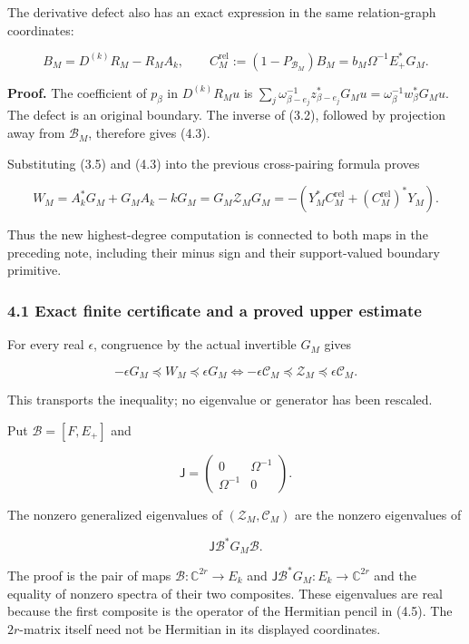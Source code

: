 The derivative defect also has an exact expression in the same
relation-graph coordinates:

\[B_M=D^{(k)}R_M-R_MA_k,\qquad
\boxed{C_M^{\mathrm{rel}}:=(1-P_{\mathcal B_M})B_M=b_M\Omega^{-1}E_+^*G_M.}\tag{4.3}\]

\textbf{Proof.} The coefficient of \(p_\beta\) in \(D^{(k)}R_Mu\) is
\(\sum_j\omega_{\beta-e_j}^{-1}z_{\beta-e_j}^*G_Mu=\omega_\beta^{-1}w_\beta^*G_Mu\).
The defect is an original boundary. The inverse of (3.2), followed by
projection away from \(\mathcal B_M\), therefore gives (4.3).

Substituting (3.5) and (4.3) into the previous cross-pairing formula
proves

\[\boxed{W_M=A_k^*G_M+G_MA_k-kG_M
=G_M\mathcal Z_MG_M
=-(Y_M^*C_M^{\mathrm{rel}}+(C_M^{\mathrm{rel}})^*Y_M).}\tag{4.4}\]

Thus the new highest-degree computation is connected to both maps in the
preceding note, including their minus sign and their support-valued
boundary primitive.

\subsubsection{4.1 Exact finite certificate and a proved upper
estimate}\label{symmetric_frontier:exact-finite-certificate-and-a-proved-upper-estimate}

For every real \(\epsilon\), congruence by the actual invertible \(G_M\)
gives

\[\boxed{-\epsilon G_M\preceq W_M\preceq\epsilon G_M
\iff -\epsilon\mathcal C_M\preceq\mathcal Z_M\preceq\epsilon\mathcal C_M.}\tag{4.5}\]

This transports the inequality; no eigenvalue or generator has been
rescaled.

Put \(\mathcal B=[F,E_+]\) and

\[\mathsf J=\begin{pmatrix}0&\Omega^{-1}\\\Omega^{-1}&0\end{pmatrix}.\]

The nonzero generalized eigenvalues of \((\mathcal Z_M,\mathcal C_M)\)
are the nonzero eigenvalues of

\[\boxed{\mathsf J\mathcal B^*G_M\mathcal B.}\tag{4.6}\]

The proof is the pair of maps \(\mathcal B:\mathbb C^{2r}\to E_k\) and
\(\mathsf J\mathcal B^*G_M:E_k\to\mathbb C^{2r}\) and the equality of
nonzero spectra of their two composites. These eigenvalues are real
because the first composite is the operator of the Hermitian pencil in
(4.5). The \(2r\)-matrix itself need not be Hermitian in its displayed
coordinates.


